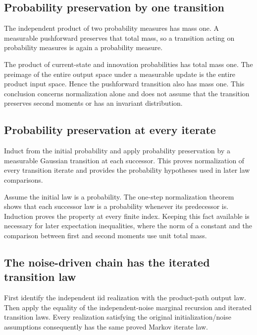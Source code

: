 \documentclass[11pt,a4paper]{article}
\begin{document}
\subsection{\texorpdfstring{Probability preservation by one transition}{Probability preservation by one transition}}


The independent product of two probability measures has mass one. A measurable pushforward preserves that total mass, so a transition acting on probability measures is again a probability measure.



The product of current-state and innovation probabilities has total mass one. The preimage of the entire output space under a measurable update is the entire product input space. Hence the pushforward transition also has mass one. This conclusion concerns normalization alone and does not assume that the transition preserves second moments or has an invariant distribution.


\subsection{\texorpdfstring{Probability preservation at every iterate}{Probability preservation at every iterate}}


Induct from the initial probability and apply probability preservation by a measurable Gaussian transition at each successor. This proves normalization of every transition iterate and provides the probability hypotheses used in later law comparisons.



Assume the initial law is a probability. The one-step normalization theorem shows that each successor law is a probability whenever its predecessor is. Induction proves the property at every finite index. Keeping this fact available is necessary for later expectation inequalities, where the norm of a constant and the comparison between first and second moments use unit total mass.


\subsection{\texorpdfstring{The noise-driven chain has the iterated transition law}{The noise-driven chain has the iterated transition law}}


First identify the independent iid realization with the product-path output law. Then apply the equality of the independent-noise marginal recursion and iterated transition laws. Every realization satisfying the original initialization/\allowbreak{}noise assumptions consequently has the same proved Markov iterate law.
\end{document}
